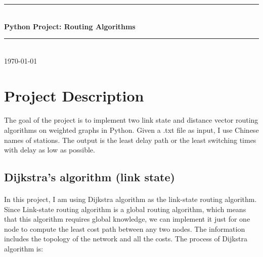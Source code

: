 \documentclass[12pt]{article}
\begin{document}
\begin{titlepage}

\newcommand{\HRule}{\rule{\linewidth}{0.5mm}} %

\center %

\HRule \\[0.4cm]
{ \huge \bfseries Python Project: Routing Algorithms}\\[0.4cm] %
\HRule \\[1.5cm]

{\large \today}\\[2cm] %

\vfill %

\end{titlepage}


\section{Project Description}
\paragraph{} 
The goal of the project is to implement two link state and distance vector routing algorithms on weighted graphs in Python. Given a .txt file as input, I use Chinese names of stations. The output is the least delay path or the least switching times with delay as low as possible. 

\subsection{Dijkstra's algorithm (link state)}

\paragraph{}
In this project, I am using Dijkstra algorithm as the link-state routing algorithm. Since Link-state routing algorithm is a global routing algorithm, which means that this algorithm requires global knowledge, we can implement it just for one node to compute the least cost path between any two nodes. The information includes the topology of the network and all the costs. The process of Dijkstra algorithm is:
\end{document}
